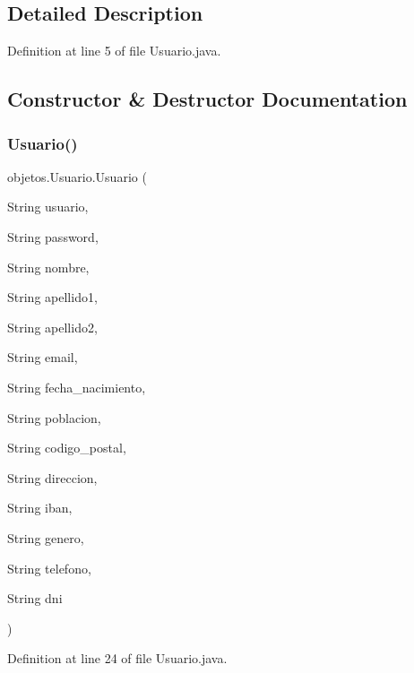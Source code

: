 \subsection{Detailed Description}


Definition at line 5 of file Usuario.\+java.



\subsection{Constructor \& Destructor Documentation}
\mbox{\label{classobjetos_1_1_usuario_a0d13573d3c808402df18a489ecb81654}} 
\subsubsection{\texorpdfstring{Usuario()}{Usuario()}\hspace{0.1cm}{\footnotesize\ttfamily [1/2]}}
{\footnotesize\ttfamily objetos.\+Usuario.\+Usuario (\begin{DoxyParamCaption}\item[{String}]{usuario,  }\item[{String}]{password,  }\item[{String}]{nombre,  }\item[{String}]{apellido1,  }\item[{String}]{apellido2,  }\item[{String}]{email,  }\item[{String}]{fecha\+\_\+nacimiento,  }\item[{String}]{poblacion,  }\item[{String}]{codigo\+\_\+postal,  }\item[{String}]{direccion,  }\item[{String}]{iban,  }\item[{String}]{genero,  }\item[{String}]{telefono,  }\item[{String}]{dni }\end{DoxyParamCaption})}



Definition at line 24 of file Usuario.\+java.

\mbox{\label{classobjetos_1_1_usuario_aa3a7114995ef02ed515c668148eb2aca}} 
